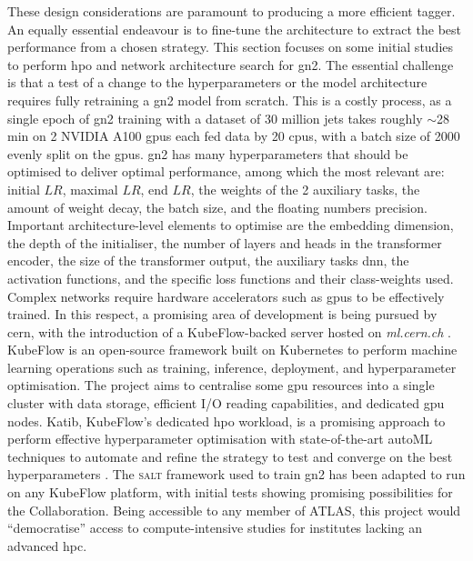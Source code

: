 These design considerations are paramount to producing a more efficient tagger. An equally essential endeavour is to fine-tune the architecture to extract the best performance from a chosen strategy. This section focuses on some initial studies to perform \gls{hpo} and network architecture search for \gls{gn2}. The essential challenge is that a test of a change to the hyperparameters or the model architecture requires fully retraining a \gls{gn2} model from scratch. This is a costly process, as a single epoch of \gls{gn2} training with a dataset of 30 million jets takes roughly $\sim$28 min on 2 NVIDIA A100 \glspl{gpu} each fed data by 20 \glspl{cpu}, with a batch size of 2000 evenly split on the \glspl{gpu}. \gls{gn2} has many hyperparameters that should be optimised to deliver optimal performance, among which the most relevant are: initial $LR$, maximal $LR$, end $LR$, the weights of the 2 auxiliary tasks, the amount of weight decay, the batch size, and the floating numbers precision. Important architecture-level elements to optimise are the embedding dimension, the depth of the initialiser, the number of layers and heads in the transformer encoder, the size of the transformer output, the auxiliary tasks \gls{dnn}, the activation functions, and the specific loss functions and their class-weights used. \\

Complex networks require hardware accelerators such as \glspl{gpu} to be effectively trained. In this respect, a promising area of development is being pursued by \gls{cern}, with the introduction of a KubeFlow-backed server hosted on \textit{ml.cern.ch} \cite{KubeFlowCern}. KubeFlow is an open-source framework built on Kubernetes to perform machine learning operations such as training, inference, deployment, and hyperparameter optimisation. The project aims to centralise some \gls{gpu} resources into a single cluster with data storage, efficient I/O reading capabilities, and dedicated \gls{gpu} nodes. Katib, KubeFlow's dedicated \gls{hpo} workload, is a promising approach to perform effective hyperparameter optimisation with state-of-the-art autoML techniques to automate and refine the strategy to test and converge on the best hyperparameters \cite{george2020katib}. The \textsc{salt} framework used to train \gls{gn2} has been adapted to run on any KubeFlow platform, with initial tests showing promising possibilities for the Collaboration. Being accessible to any member of ATLAS, this project would ``democratise'' access to compute-intensive studies for institutes lacking an advanced \gls{hpc}. \\

